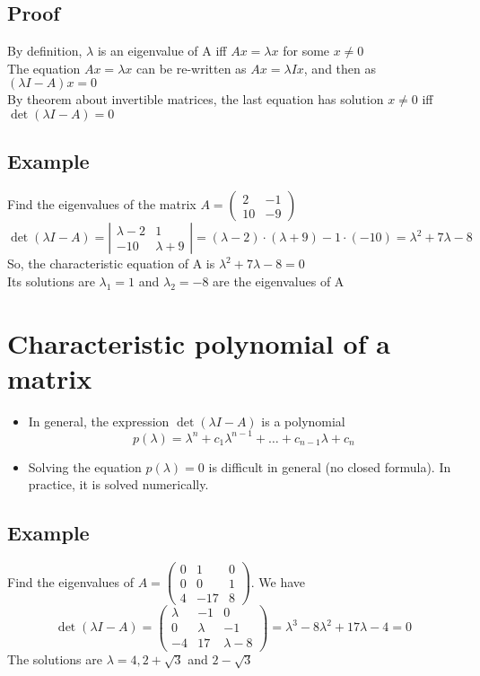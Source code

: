 \documentclass{article}[18pt]
\begin{document}
\subsection{Proof}
By definition, $\lambda$ is an eigenvalue of A iff $Ax=\lambda x$ for some $x\neq 0$\\
The equation $Ax=\lambda x$ can be re-written as $Ax=\lambda Ix$, and then as $(\lambda I-A)x=0$\\
By theorem about invertible matrices, the last equation has solution $x\neq 0$ iff $\operatorname{det}(\lambda I-A)=0$
\subsection{Example}
Find the eigenvalues of the matrix $A=\left( \begin{array}{cc}{2} & {-1} \\ {10} & {-9}\end{array}\right)$
\[ 
\operatorname{det}(\lambda I-A)=\left| \begin{array}{cc}{\lambda-2} & {1} \\ {-10} & {\lambda+9}\end{array}\right|=(\lambda-2) \cdot(\lambda+9)-1 \cdot(-10)=\lambda^{2}+7 \lambda-8
\]
So, the characteristic equation of A is $\lambda^2+7\lambda-8=0$\\
Its solutions are $\lambda_1=1$ and $\lambda_2=-8$ are the eigenvalues of A
\section{Characteristic polynomial of a matrix}
\begin{itemize}
	\item In general, the expression $\operatorname{det}(\lambda I-A)$ is a polynomial
	\[ 
	p(\lambda)=\lambda^{n}+c_{1} \lambda^{n-1}+\ldots+c_{n-1} \lambda+c_{n}
	\]
	\item Solving the equation $p(\lambda)=0$ is difficult in general (no closed formula). In practice, it is solved numerically.
\end{itemize}
\subsection{Example}
Find the eigenvalues of $A=\left( \begin{array}{rrr}{0} & {1} & {0} \\ {0} & {0} & {1} \\ {4} & {-17} & {8}\end{array}\right)$. We have
\[ 
\operatorname{det}(\lambda I-A)=\left( \begin{array}{ccc}{\lambda} & {-1} & {0} \\ {0} & {\lambda} & {-1} \\ {-4} & {17} & {\lambda-8}\end{array}\right)=\lambda^{3}-8 \lambda^{2}+17 \lambda-4=0
\]
The solutions are $\lambda=4, 2+\sqrt{3}$ and $2-\sqrt{3}$
\end{document}

